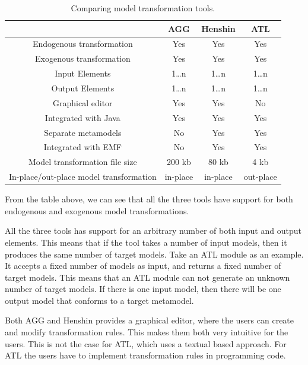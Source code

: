 \documentclass[pdftex,11pt,a4paper]{article}
\begin{document}
\begin{table}[ht]
\centering
\begin{tabular}{| c | c | c | c |}
\hline
 & AGG & Henshin & ATL \\
\hline
Endogenous transformation & \cellcolor{green!25}Yes &
\cellcolor{green!25}Yes & \cellcolor{green!25}Yes \\

Exogenous transformation & \cellcolor{green!25}Yes &
\cellcolor{green!25}Yes & \cellcolor{green!25}Yes \\

Input Elements & 1\ldots n & 1\ldots n & 1\ldots n\\
Output Elements & 1\ldots n & 1\ldots n & 1\ldots n\\
Graphical editor &\cellcolor{green!25}Yes &
\cellcolor{green!25}Yes &\cellcolor{red!25}No  \\
Integrated with Java & \cellcolor{green!25}Yes &
\cellcolor{green!25}Yes & \cellcolor{green!25}Yes \\
Separate metamodels & \cellcolor{red!25}No &
\cellcolor{green!25}Yes & \cellcolor{green!25}Yes \\
Integrated with EMF & \cellcolor{red!25}No &
\cellcolor{green!25}Yes & \cellcolor{green!25}Yes \\
Model transformation file size &200 kb &80 kb &4 kb \\
In-place/out-place model transformation &in-place &
in-place &out-place \\
\hline

\end{tabular}
\caption{Comparing model transformation tools.}
\end{table}

\newpage

From the table above, we can see that all the three tools have support
for both endogenous and exogenous model transformations. 

All the three tools has support for an arbitrary number of both input and
output elements. This means that if the tool takes a number of input models, then it
produces the same number of target models. Take an ATL module as an example. It
accepts a fixed number of models as input, and returns a fixed number of target
models. This means that an ATL module can not generate an unknown number of
target models. If there is one input model, then there will be one output model
that conforms to a target metamodel.

Both AGG and Henshin provides a graphical editor, where the users can create and
modify transformation rules. This makes them both very intuitive for the users.
This is not the case for ATL, which uses a textual based approach. For ATL the
users have to implement transformation rules in programming code.
\end{document}
